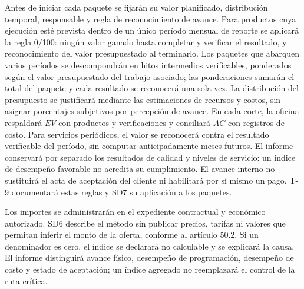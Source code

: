 Antes de iniciar cada paquete se fijarán su valor planificado, distribución temporal, responsable y regla de reconocimiento de avance. Para productos cuya ejecución esté prevista dentro de un único período mensual de reporte se aplicará la regla 0/100: ningún valor ganado hasta completar y verificar el resultado, y reconocimiento del valor presupuestado al terminarlo. Los paquetes que abarquen varios períodos se descompondrán en hitos intermedios verificables, ponderados según el valor presupuestado del trabajo asociado; las ponderaciones sumarán el total del paquete y cada resultado se reconocerá una sola vez. La distribución del presupuesto se justificará mediante las estimaciones de recursos y costos, sin asignar porcentajes subjetivos por percepción de avance. En cada corte, la oficina respaldará $EV$ con productos y verificaciones y conciliará $AC$ con registros de costo. Para servicios periódicos, el valor se reconocerá contra el resultado verificable del período, sin computar anticipadamente meses futuros. El informe conservará por separado los resultados de calidad y niveles de servicio: un índice de desempeño favorable no acredita su cumplimiento. El avance interno no sustituirá el acta de aceptación del cliente ni habilitará por sí mismo un pago. T-9 documentará estas reglas y SD7 su aplicación a los paquetes.

Los importes se administrarán en el expediente contractual y económico autorizado. SD6 describe el método sin publicar precios, tarifas ni valores que permitan inferir el monto de la oferta, conforme al artículo 50.2. Si un denominador es cero, el índice se declarará no calculable y se explicará la causa. El informe distinguirá avance físico, desempeño de programación, desempeño de costo y estado de aceptación; un índice agregado no reemplazará el control de la ruta crítica. \parencite[art.~50.2, p.~29]{sd6-ba}

